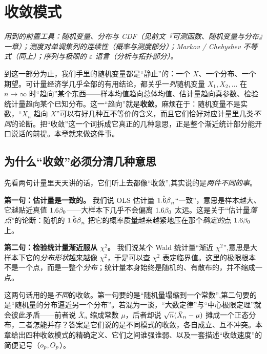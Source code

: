 \chapter{收敛模式}
\label{ch:convergence}

\noindent\emph{用到的前置工具：随机变量、分布与 CDF（见前文『可测函数、随机变量与分布』一章）；测度对单调集列的连续性（概率与测度部分）；Markov / Chebyshev 不等式（同上）；序列与极限的 $\varepsilon$ 语言（分析与拓扑部分）。}
\medskip

到这一部分为止，我们手里的随机变量都是``静止''的：一个 $X$、一个分布、一个期望。可计量经济学几乎全部的有用结论，都关乎一\emph{列}随机变量 $X_1,X_2,\dots$ 在 $n\to\infty$ 时``趋向''某个东西——样本均值趋向总体均值、估计量趋向真参数、检验统计量趋向某个已知分布。这一``趋向''就是\textbf{收敛}。麻烦在于：随机变量不是实数，``$X_n$ 趋向 $X$''可以有好几种互不等价的含义，而且它们恰好对应计量里几类\emph{不同}的论断。把``收敛''这一个词拆成它真正的几种意思，正是整个渐近统计部分能开口说话的前提。本章就来做这件事。

\section{为什么``收敛''必须分清几种意思}
\label{sec:convergence-1}

先看两句计量里天天讲的话，它们听上去都像``收敛'',其实说的是\emph{两件不同的事}。

\textbf{第一句：估计量是一致的。} 我们说 OLS 估计量 $\hat{1.6\beta}_n$``一致''，意思是样本越大、它越贴近真值 $1.6\beta_0$——大样本下几乎不会偏离 $1.6\beta_0$ 太远。这是关于``估计量\emph{落点}''的论断：随机的 $\hat{1.6\beta}_n$ 把它的概率质量越来越紧地压在那个\emph{确定的}点 $1.6\beta_0$ 上。

\textbf{第二句：检验统计量渐近服从 $\chi^2$。} 我们说某个 Wald 统计量``渐近 $\chi^2$'',意思是大样本下它的\emph{分布形状}越来越像 $\chi^2$，于是可以查 $\chi^2$ 表定临界值。这里的极限根本不是一个点，而是一整个\emph{分布}；统计量本身始终是随机的、有散布的，并不缩成一点。

这两句话用的是\emph{不同}的收敛。第一句要的是``随机量塌缩到一个常数'',第二句要的是``随机量的分布逼近另一个分布''。若混为一谈，``大数定律''与``中心极限定理''就会彼此矛盾——前者说 $\bar X_n$ 缩成常数 $\mu$，后者却说 $\sqrt{n}(\bar X_n-\mu)$ 摊成一个正态分布，二者怎能并存？答案是它们说的是不同模式的收敛，各自成立、互不冲突。本章给出四种收敛模式的精确定义、它们之间谁强谁弱、以及一套描述``收敛速度''的简便记号（$o_{p},O_{p}$）。


